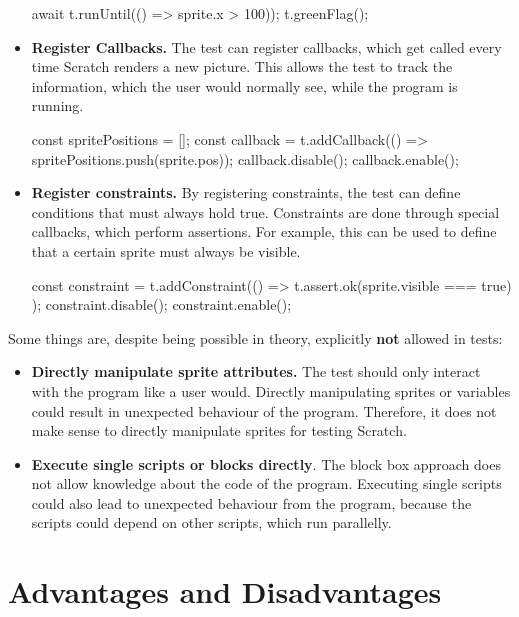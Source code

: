 \begin{itemize}
\begin{javascriptcode}
            await t.runUntil(() => sprite.x > 100));
            t.greenFlag();
        \end{javascriptcode}
    \item \textbf{Register Callbacks.}
        The test can register callbacks, which get called every time Scratch renders a new picture.
        This allows the test to track the information, which the user would normally see, while the program is running.
        \begin{javascriptcode}
            const spritePositions = [];
            const callback = t.addCallback(() => spritePositions.push(sprite.pos));
            callback.disable();
            callback.enable();
        \end{javascriptcode}
    \item \textbf{Register constraints.}
        By registering constraints, the test can define conditions that must always hold true.
        Constraints are done through special callbacks, which perform assertions.
        For example, this can be used to define that a certain sprite must always be visible.
        \begin{javascriptcode}
            const constraint = t.addConstraint(() => {
                t.assert.ok(sprite.visible === true)
            });
            constraint.disable();
            constraint.enable();
        \end{javascriptcode}
\end{itemize}

\noindent Some things are, despite being possible in theory, explicitly \textbf{not} allowed in tests:

\begin{itemize}
    \item \textbf{Directly manipulate sprite attributes.}
        The test should only interact with the program like a user would.
        Directly manipulating sprites or variables could result in unexpected behaviour of the program.
        Therefore, it does not make sense to directly manipulate sprites for testing Scratch.
    \item \textbf{Execute single scripts or blocks directly}.
        The block box approach does not allow knowledge about the code of the program.
        Executing single scripts could also lead to unexpected behaviour from the program, because the scripts could depend on other scripts, which run parallelly.
\end{itemize}

\section{Advantages and Disadvantages}


